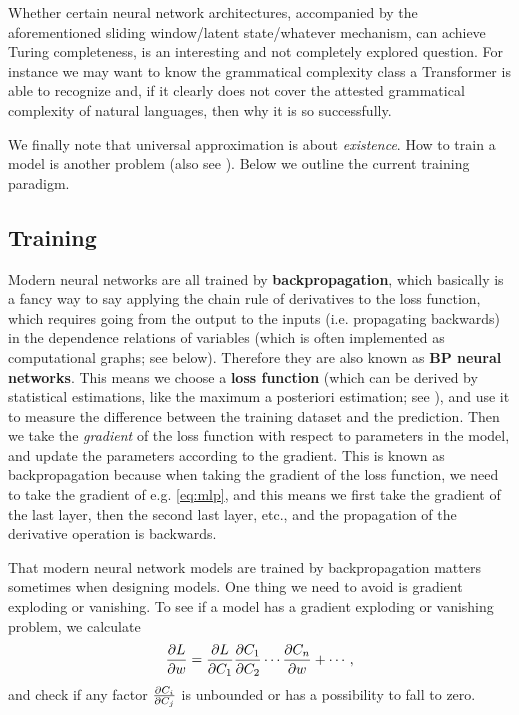 \documentclass[hyperref, a4paper, 12pt]{report}
\newcommand*{\concept}[1]{{\textbf{#1}}}
\begin{document}
Whether certain neural network architectures, accompanied by the aforementioned sliding window/latent state/whatever mechanism, can achieve Turing completeness,
is an interesting and not completely explored question.
For instance we may want to know the grammatical complexity class a Transformer is able to recognize and, if it clearly does not cover the attested grammatical complexity of natural languages, then why it is so successfully.

We finally note that universal approximation is about \emph{existence}.
How to train a model is another problem (also see ). Below we outline the current training paradigm.

\subsection{Training}

Modern neural networks are all trained by \concept{backpropagation},
which basically is a fancy way to say applying the chain rule of derivatives to the loss function,
which requires going from the output to the inputs (i.e. propagating backwards) in the dependence relations of variables (which is often implemented as computational graphs; see below).
Therefore they are also known as \concept{BP neural networks}.
This means we choose a \concept{loss function} (which can be derived by statistical estimations,
like the maximum a posteriori estimation; see ),
and use it to measure the difference between the training dataset and the prediction.
Then we take the \emph{gradient} of the loss function with respect to parameters in the model,
and update the parameters according to the gradient.
This is known as backpropagation because when taking the gradient of the loss function,
we need to take the gradient of e.g. \eqref{eq:mlp},
and this means we first take the gradient of the last layer,
then the second last layer, etc.,
and the propagation of the derivative operation is backwards.

That modern neural network models are trained by backpropagation matters sometimes when designing models.
One thing we need to avoid is gradient exploding or vanishing.
To see if a model has a gradient exploding or vanishing problem,
we calculate 
\begin{equation}
    \pdv{L}{w} = \pdv{L}{C_1} \pdv{C_1}{C_2} \cdots \pdv{C_n}{w} + \cdots,
\end{equation}
and check if any factor $\pdv{C_i}{C_j}$ is unbounded or has a possibility to fall to zero.
\end{document}
